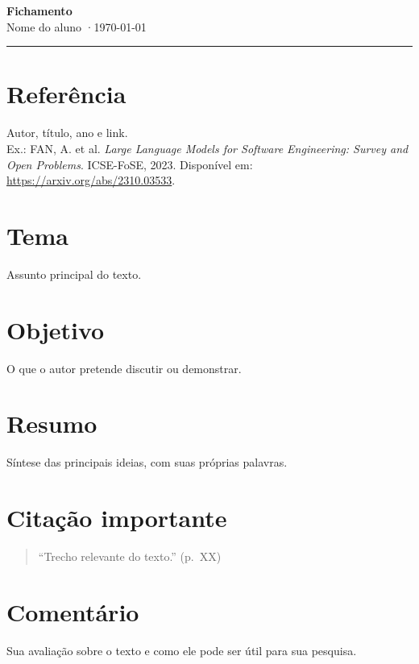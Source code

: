 \documentclass[11pt,a4paper]{article}
\newcommand{\aluno}{Nome do aluno}
\newcommand{\datafichamento}{\today}
\begin{document}
{\Large\bfseries Fichamento}\\[2pt]
{\small \aluno{} \quad·\quad \datafichamento}

\hrule\vspace{6pt}

\section*{Referência}
Autor, título, ano e link.\\
Ex.: FAN, A. et al. \emph{Large Language Models for Software Engineering:
Survey and Open Problems}. ICSE-FoSE, 2023.
Disponível em: \url{https://arxiv.org/abs/2310.03533}.

\section*{Tema}
Assunto principal do texto.

\section*{Objetivo}
O que o autor pretende discutir ou demonstrar.

\section*{Resumo}
Síntese das principais ideias, com suas próprias palavras.

\section*{Citação importante}
\begin{quote}
\enquote{Trecho relevante do texto.} (p.~XX)
\end{quote}

\section*{Comentário}
Sua avaliação sobre o texto e como ele pode ser útil para sua pesquisa.
\end{document}

